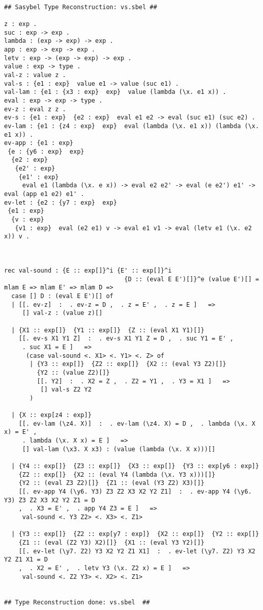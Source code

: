 \documentclass[12pt]{article}
\begin{document}
\footnotesize\begin{verbatim}

## Sasybel Type Reconstruction: vs.sbel ##

z : exp .
suc : exp -> exp .
lambda : (exp -> exp) -> exp .
app : exp -> exp -> exp .
letv : exp -> (exp -> exp) -> exp .
value : exp -> type .
val-z : value z .
val-s : {e1 : exp}  value e1 -> value (suc e1) .
val-lam : {e1 : {x3 : exp}  exp}  value (lambda (\x. e1 x)) .
eval : exp -> exp -> type .
ev-z : eval z z .
ev-s : {e1 : exp}  {e2 : exp}  eval e1 e2 -> eval (suc e1) (suc e2) .
ev-lam : {e1 : {z4 : exp}  exp}  eval (lambda (\x. e1 x)) (lambda (\x. e1 x)) .
ev-app : {e1 : exp} 
 {e : {y6 : exp}  exp} 
  {e2 : exp} 
   {e2' : exp} 
    {e1' : exp} 
     eval e1 (lambda (\x. e x)) -> eval e2 e2' -> eval (e e2') e1' -> eval (app e1 e2) e1' .
ev-let : {e2 : {y7 : exp}  exp} 
 {e1 : exp} 
  {v : exp} 
   {v1 : exp}  eval (e2 e1) v -> eval e1 v1 -> eval (letv e1 (\x. e2 x)) v .

              

rec val-sound : {E :: exp[]}^i {E' :: exp[]}^i
                                 {D :: (eval E E')[]}^e (value E')[] = 
mlam E => mlam E' => mlam D => 
  case [] D : (eval E E')[] of 
  | [[. ev-z]  :  . ev-z = D ,  . z = E' ,  . z = E ]   => 
     [] val-z : (value z)[]
  
  | {X1 :: exp[]}  {Y1 :: exp[]}  {Z :: (eval X1 Y1)[]}
    [[. ev-s X1 Y1 Z]  :  . ev-s X1 Y1 Z = D ,  . suc Y1 = E' ,
     . suc X1 = E ]   => 
      (case val-sound <. X1> <. Y1> <. Z> of 
       | {Y3 :: exp[]}  {Z2 :: exp[]}  {X2 :: (eval Y3 Z2)[]} 
         {Y2 :: (value Z2)[]}
         [[. Y2]  :  . X2 = Z ,  . Z2 = Y1 ,  . Y3 = X1 ]   => 
          [] val-s Z2 Y2
       )
  
  | {X :: exp[z4 : exp]}
    [[. ev-lam (\z4. X)]  :  . ev-lam (\z4. X) = D ,  . lambda (\x. X x) = E' ,
     . lambda (\x. X x) = E ]   => 
     [] val-lam (\x3. X x3) : (value (lambda (\x. X x)))[]
  
  | {Y4 :: exp[]}  {Z3 :: exp[]}  {X3 :: exp[]}  {Y3 :: exp[y6 : exp]} 
    {Z2 :: exp[]}  {X2 :: (eval Y4 (lambda (\x. Y3 x)))[]} 
    {Y2 :: (eval Z3 Z2)[]}  {Z1 :: (eval (Y3 Z2) X3)[]}
    [[. ev-app Y4 (\y6. Y3) Z3 Z2 X3 X2 Y2 Z1]  :  . ev-app Y4 (\y6. Y3) Z3 Z2 X3 X2 Y2 Z1 = D
    ,  . X3 = E' ,  . app Y4 Z3 = E ]   => 
     val-sound <. Y3 Z2> <. X3> <. Z1>
  
  | {Y3 :: exp[]}  {Z2 :: exp[y7 : exp]}  {X2 :: exp[]}  {Y2 :: exp[]} 
    {Z1 :: (eval (Z2 Y3) X2)[]}  {X1 :: (eval Y3 Y2)[]}
    [[. ev-let (\y7. Z2) Y3 X2 Y2 Z1 X1]  :  . ev-let (\y7. Z2) Y3 X2 Y2 Z1 X1 = D
    ,  . X2 = E' ,  . letv Y3 (\x. Z2 x) = E ]   => 
     val-sound <. Z2 Y3> <. X2> <. Z1>
  

## Type Reconstruction done: vs.sbel  ##

\end{verbatim}
\end{document}
